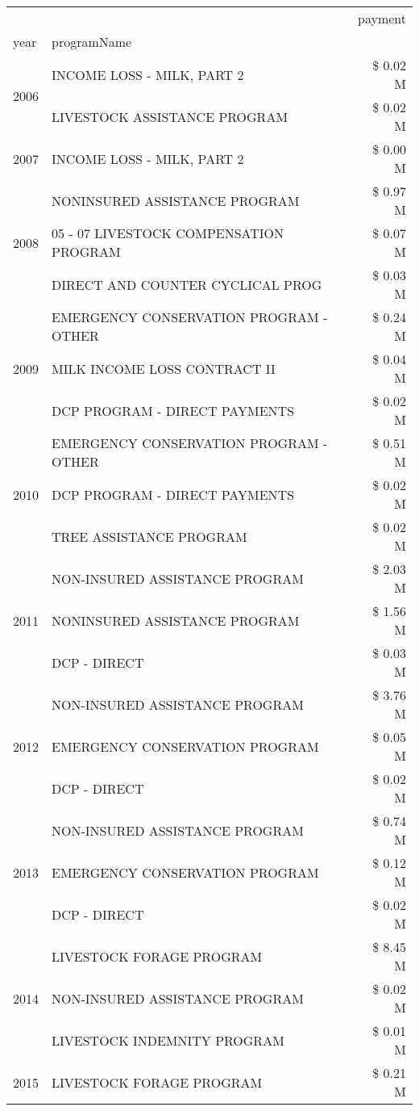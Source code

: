 \begin{tabular}{llr}
\toprule
 &  & payment \\
year & programName &  \\
\midrule
\multirow[t]{2}{*}{2006} & INCOME LOSS - MILK, PART 2 & \$ 0.02 M \\
 & LIVESTOCK ASSISTANCE PROGRAM & \$ 0.02 M \\
\cline{1-3}
2007 & INCOME LOSS - MILK, PART 2 & \$ 0.00 M \\
\cline{1-3}
\multirow[t]{3}{*}{2008} & NONINSURED ASSISTANCE PROGRAM & \$ 0.97 M \\
 & 05 - 07 LIVESTOCK COMPENSATION PROGRAM & \$ 0.07 M \\
 & DIRECT AND COUNTER CYCLICAL PROG & \$ 0.03 M \\
\cline{1-3}
\multirow[t]{3}{*}{2009} & EMERGENCY CONSERVATION PROGRAM - OTHER & \$ 0.24 M \\
 & MILK INCOME LOSS CONTRACT II & \$ 0.04 M \\
 & DCP PROGRAM - DIRECT PAYMENTS & \$ 0.02 M \\
\cline{1-3}
\multirow[t]{3}{*}{2010} & EMERGENCY CONSERVATION PROGRAM - OTHER & \$ 0.51 M \\
 & DCP PROGRAM - DIRECT PAYMENTS & \$ 0.02 M \\
 & TREE ASSISTANCE PROGRAM & \$ 0.02 M \\
\cline{1-3}
\multirow[t]{3}{*}{2011} & NON-INSURED ASSISTANCE PROGRAM & \$ 2.03 M \\
 & NONINSURED ASSISTANCE PROGRAM & \$ 1.56 M \\
 & DCP - DIRECT & \$ 0.03 M \\
\cline{1-3}
\multirow[t]{3}{*}{2012} & NON-INSURED ASSISTANCE PROGRAM & \$ 3.76 M \\
 & EMERGENCY CONSERVATION PROGRAM & \$ 0.05 M \\
 & DCP - DIRECT & \$ 0.02 M \\
\cline{1-3}
\multirow[t]{3}{*}{2013} & NON-INSURED ASSISTANCE PROGRAM & \$ 0.74 M \\
 & EMERGENCY CONSERVATION PROGRAM & \$ 0.12 M \\
 & DCP - DIRECT & \$ 0.02 M \\
\cline{1-3}
\multirow[t]{3}{*}{2014} & LIVESTOCK FORAGE PROGRAM & \$ 8.45 M \\
 & NON-INSURED ASSISTANCE PROGRAM & \$ 0.02 M \\
 & LIVESTOCK INDEMNITY PROGRAM & \$ 0.01 M \\
\cline{1-3}
\multirow[t]{3}{*}{2015} & LIVESTOCK FORAGE PROGRAM & \$ 0.21 M \\

\end{tabular}
